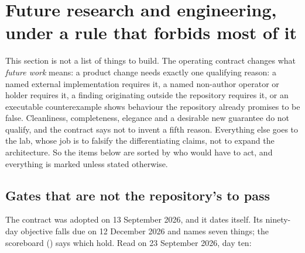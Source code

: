 \section{Future research and engineering, under a rule that forbids most of it}
\label{sec:research}



This section is not a list of things to build. The operating contract changes what \emph{future
work} means: a product change needs exactly one qualifying reason: a named external implementation
requires it, a named non-author operator or holder requires it, a finding originating outside the
repository requires it, or an executable counterexample shows behaviour the repository already
promises to be false. Cleanliness, completeness, elegance and a desirable new guarantee do not
qualify, and the contract says not to invent a fifth reason. Everything else goes to the lab, whose
job is to falsify the differentiating claims, not to expand the architecture. So the items below are
sorted by who would have to act, and everything is marked \sFut{} unless stated otherwise.


\subsection{Gates that are not the repository's to pass}

The contract was adopted on 13 September 2026, and it dates itself. Its ninety-day objective falls
due on 12 December 2026 and names seven things; the scoreboard () says
which hold. Read on 23 September 2026, day ten:

